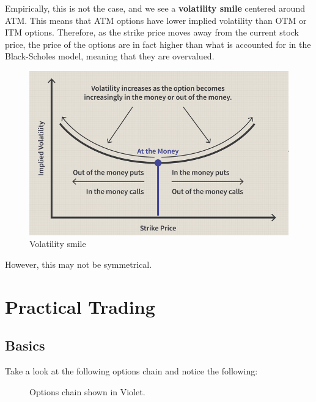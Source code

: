 \documentclass{article}
\begin{document}
    \begin{definition}
      Empirically, this is not the case, and we see a \textbf{volatility smile} centered around ATM. This means that ATM options have lower implied volatility than OTM or ITM options. Therefore, as the strike price moves away from the current stock price, the price of the options are in fact higher than what is accounted for in the Black-Scholes model, meaning that they are overvalued.  
      \begin{figure}[H]
        \centering 
        \includegraphics[scale=0.4]{img/vol_smile.png}
        \caption{Volatility smile} 
        \label{fig:vol_smile}
      \end{figure}
    \end{definition}

    However, this may not be symmetrical. 

    \begin{definition}
      
    \end{definition}

\section{Practical Trading}

  \subsection{Basics} 

    Take a look at the following options chain and notice the following: 

    \begin{figure}[H]
      \centering 
      \caption{Options chain shown in Violet. } 
      \label{fig:violet}
    \end{figure}
\end{document}
